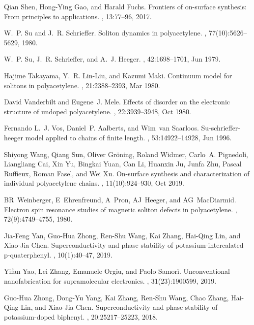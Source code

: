 \documentclass[10pt,a4paper]{article}
\begin{document}
\begin{thebibliography}{10}
Qian Shen, Hong-Ying Gao, and Harald Fuchs.
\newblock Frontiers of on-surface synthesis: From principles to applications.
, 13:77--96, 2017.

W.~P. Su and J.~R. Schrieffer.
\newblock Soliton dynamics in polyacetylene.
,
  77(10):5626--5629, 1980.

W.~P. Su, J.~R. Schrieffer, and A.~J. Heeger.
, 42:1698--1701, Jun 1979.

Hajime Takayama, Y.~R. Lin-Liu, and Kazumi Maki.
\newblock Continuum model for solitons in polyacetylene.
, 21:2388--2393, Mar 1980.

David Vanderbilt and Eugene~J. Mele.
\newblock Effects of disorder on the electronic structure of undoped
  polyacetylene.
, 22:3939--3948, Oct 1980.

Fernando L.~J. Vos, Daniel~P. Aalberts, and Wim~van Saarloos.
\newblock Su-schrieffer-heeger model applied to chains of finite length.
, 53:14922--14928, Jun 1996.

Shiyong Wang, Qiang Sun, Oliver Gr{\"o}ning, Roland Widmer, Carlo~A. Pignedoli,
  Liangliang Cai, Xin Yu, Bingkai Yuan, Can Li, Huanxin Ju, Junfa Zhu, Pascal
  Ruffieux, Roman Fasel, and Wei Xu.
\newblock On-surface synthesis and characterization of individual polyacetylene
  chains.
, 11(10):924--930, Oct 2019.

BR~Weinberger, E~Ehrenfreund, A~Pron, AJ~Heeger, and AG~MacDiarmid.
\newblock Electron spin resonance studies of magnetic soliton defects in
  polyacetylene.
, 72(9):4749--4755, 1980.

Jia-Feng Yan, Guo-Hua Zhong, Ren-Shu Wang, Kai Zhang, Hai-Qing Lin, and
  Xiao-Jia Chen.
\newblock Superconductivity and phase stability of potassium-intercalated
  p-quaterphenyl.
, 10(1):40--47, 2019.

Yifan Yao, Lei Zhang, Emanuele Orgiu, and Paolo Samorì.
\newblock Unconventional nanofabrication for supramolecular electronics.
, 31(23):1900599, 2019.

Guo-Hua Zhong, Dong-Yu Yang, Kai Zhang, Ren-Shu Wang, Chao Zhang, Hai-Qing Lin,
  and Xiao-Jia Chen.
\newblock Superconductivity and phase stability of potassium-doped biphenyl.
, 20:25217--25223, 2018.

\end{thebibliography}
\end{document}
